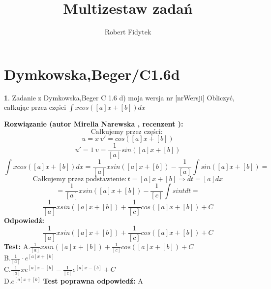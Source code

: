 \documentclass[12pt, a4paper]{article}
\title{Multizestaw zadań}
\author{Robert Fidytek}
\date{}
\theoremstyle{definition} %
\newtheorem{zad}{}
\newcommand{\kategoria}[1]{\section{#1}} %
\newcommand{\zadStart}[1]{\begin{zad}#1\newline} %
\newcommand{\zadStop}{\end{zad}}   %
\newcommand{\rozwStart}[2]{\noindent \textbf{Rozwiązanie (autor #1 , recenzent #2): }\newline} %
\newcommand{\odpStart}{\noindent \textbf{Odpowiedź:}\newline}    %
\newcommand{\odpStop}{\newline}                                             %
\newcommand{\testStart}{\noindent \textbf{Test:}\newline} %
\newcommand{\testStop}{\newline} %
\newcommand{\kluczStart}{\noindent \textbf{Test poprawna odpowiedź:}\newline} %
\newcommand{\kluczStop}{\newline} %
\begin{document}
\maketitle



\kategoria{Dymkowska,Beger/C1.6d}
\zadStart{Zadanie z Dymkowska,Beger C 1.6 d) moja wersja nr [nrWersji]}
Obliczyć, całkując przez części $\displaystyle \int xcos([a]x+[b])dx$
\zadStop
\rozwStart{Mirella Narewska}{}
$$\text{Całkujemy przez części: }$$
$$u=x \ v'=cos([a]x+[b])$$
$$u'=1 \ v=\frac{1}{[a]}sin([a]x+[b])$$
$$\displaystyle \int xcos([a]x+[b])dx=\displaystyle \frac{1}{[a]}xsin([a]x+[b])- \frac{1}{[a]}\int sin([a]x+[b])=$$
$$\text{Całkujemy przez podstawienie}: t= [a]x+[b] \Rightarrow dt=[a]dx$$
$$=\displaystyle  \frac{1}{[a]}xsin([a]x+[b])- \frac{1}{[c]}\int sint dt =$$
$$\displaystyle \frac{1}{[a]}xsin([a]x+[b])+ \frac{1}{[c]}cos([a]x+[b]) + C$$
\odpStart
$$\frac{1}{[a]}xsin([a]x+[b])+ \frac{1}{[c]}cos([a]x+[b]) + C$$
\odpStop
\testStart
A.$\frac{1}{[a]}xsin([a]x+[b])+ \frac{1}{[c]}cos([a]x+[b]) + C$
\\
B.$\frac{1}{[a]}\cdot e^{[a]x+[b]}$
\\
C.$\frac{1}{[a]}xe^{[a]x-[b]} -\frac{1}{[c]}e^{[a]x-[b]} + C$
\\
D.$e^{[a]x+[b]}$
\testStop
\kluczStart
A
\kluczStop
\end{document}
